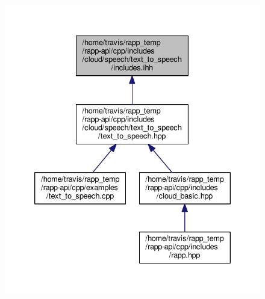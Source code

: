 \begin{figure}[H]
\begin{center}
\leavevmode
\includegraphics[width=335pt]{cloud_2speech_2text__to__speech_2includes_8ihh__dep__incl}
\end{center}
\end{figure}
